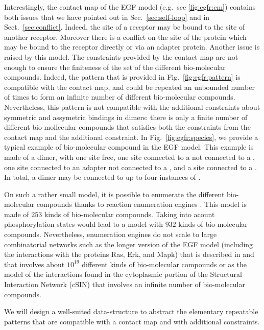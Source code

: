 \documentclass{entcs}
\begin{document}
Interestingly, the contact map of the EGF model (e.g.~see \ref{fig:egfr:cm})
contains both issues that we have pointed out in Sec.~\ref{sec:self-loop} and in Sect.~\ref{sec:conflict}. Indeed, the site  of a receptor may be bound to the site  of another receptor. Moreover there is a conflict on the site  of the protein  which may be bound to the receptor directly
or via an adapter protein. Another issue is raised by this model.
The constraints provided by the contact map are not enough to ensure the finiteness of the set of the different bio-molecular compounds. Indeed,
the pattern that is provided in Fig.~\ref{fig:egfr:pattern} is compatible with the contact map, and could be repeated an unbounded number of times to form an infinite number of different bio-molecular compounds. Nevertheless, this pattern is not compatible with the additional constraints about symmetric and assymetric bindings in dimers: there is only a finite number of different bio-mollecular compounds that satisfies both
the constraints from the contact map and the additional constraint.
In Fig.~\ref{fig:egfr:species}, we provide a typical example of bio-molecular compound in the EGF model. This example is made of a dimer, with one site  free, one site  connected to a  not connected to a , one site  connected to an adapter not connected to a , and a site  connected to a . In total, a dimer may be connected to up to four instances of .

On such a rather small model, it is possible to enumerate the different bio-molecular compounds thanks to reaction enumeration engines  \cite{BNGL,KaDe}. This model is made of $253$ kinds of bio-molecular compounds.
Taking into acount phosphorylation states would lead to a model
with $932$ kinds of bio-molecular compounds. Nevertheless, enumeration engines do not scale to large combinatorial networks such as the longer version of the EGF model (including the interactions with the proteins Ras, Erk, and Mapk) that is described in \cite{DanosEtAl-CONCUR07} and that involves about $10^{19}$ different kinds of bio-molecular compounds \cite{DanosEtAl-VMCAI08} or as the model of the interactions found in the cytoplasmic portion of the Structural Interaction Network (cSIN) \cite{Deeds-et-al-plosone2012,Kim} that involves an infinite number of bio-molecular compounds.

We will design a well-suited data-structure to abstract the elementary repeatable patterns that are compatible with a contact map and with additional constraints.
\end{document}
